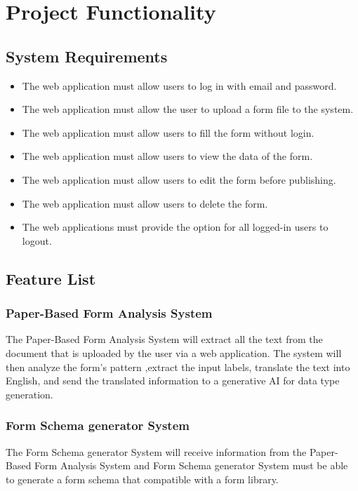 \documentclass[12pt,oneside,openright,a4paper]{cpe-english-project}
\begin{document}
\section{Project Functionality}

\subsection{System Requirements}

\begin{itemize}
 \item The web application must allow users to log in with email and password. 
 \item The web application must allow the user to upload a form file to the system.
 \item The web application must allow users to fill the form without login.
 \item The web application must allow users to view the data of the form.
 \item The web application must allow users to edit the form before publishing.
 \item The web application must allow users to delete the form.
 \item The web applications must provide the option for all logged-in users to logout.
\end{itemize}

\subsection{Feature List}

\subsubsection{Paper-Based Form Analysis System}

The Paper-Based Form Analysis System will extract all the text from the document that is uploaded by the user via a web application. The system will then analyze the form’s pattern ,extract the input labels, translate the text into English, and send the translated information to a generative AI for data type generation.

\subsubsection{Form Schema generator System}

The Form Schema generator System will receive information from the Paper-Based Form Analysis System and Form Schema generator System must be able to generate a form schema that compatible with a form library.
\end{document}
